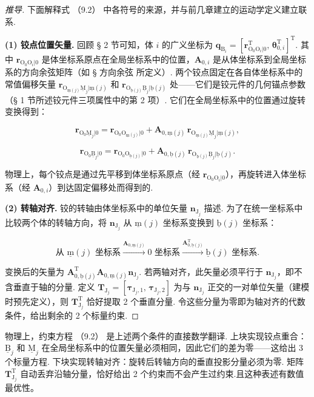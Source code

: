 \begin{proof}[推导]
下面解释式 （9.2） 中各符号的来源，并与前几章建立的运动学定义建立联系.

\textbf{(1) 铰点位置矢量.} 回顾 § 2 节可知，体 $i$ 的广义坐标为 $\boldsymbol{q}_{\text{B}_i} = [\boldsymbol{r}_{\text{O}_0\text{O}_i|0}^\text{T},\, \boldsymbol{\theta}_{0,i}^\text{T}]^\text{T}$. 其中 $\boldsymbol{r}_{\text{O}_0\text{O}_i|0}$ 是体坐标系原点在全局坐标系中的位置，$\boldsymbol{A}_{0,i}$ 是从体坐标系到全局坐标系的方向余弦矩阵（如 § 方向余弦 所定义）. 两个铰点固定在各自体坐标系中的常值偏移矢量 $\boldsymbol{r}_{\text{O}_{\underline{\text{m}}(j)}\underline{\text{M}}_j|\underline{\text{m}}(j)}$ 和 $\boldsymbol{r}_{\text{O}_{\underline{\text{b}}(j)}\underline{\text{B}}_j|\underline{\text{b}}(j)}$ 处——它们是铰元件的几何锚点参数（§ 1 节所述铰元件三项属性中的第 2 项）. 它们在全局坐标系中的位置通过旋转变换得到：

\[
\boldsymbol{r}_{\text{O}_0\underline{\text{M}}_j|0} = \boldsymbol{r}_{\text{O}_0\text{O}_{\underline{\text{m}}(j)}|0} + \boldsymbol{A}_{0,\underline{\text{m}}(j)}\,\boldsymbol{r}_{\text{O}_{\underline{\text{m}}(j)}\underline{\text{M}}_j|\underline{\text{m}}(j)},
\]

\[
\boldsymbol{r}_{\text{O}_0\underline{\text{B}}_j|0} = \boldsymbol{r}_{\text{O}_0\text{O}_{\underline{\text{b}}(j)}|0} + \boldsymbol{A}_{0,\underline{\text{b}}(j)}\,\boldsymbol{r}_{\text{O}_{\underline{\text{b}}(j)}\underline{\text{B}}_j|\underline{\text{b}}(j)}.
\]

物理上，每个铰点是通过先平移到体坐标系原点（经 $\boldsymbol{r}_{\text{O}_0\text{O}_i|0}$），再旋转进入体坐标系（经 $\boldsymbol{A}_{0,i}$）到达固定偏移处而得到的.

\textbf{(2) 转轴对齐.} 铰的转轴由体坐标系中的单位矢量 $\boldsymbol{n}_{\text{J}_j}$ 描述. 为了在统一坐标系中比较两个体的转轴方向，将 $\boldsymbol{n}_{\text{J}_j}$ 从 $\underline{\text{m}}(j)$ 坐标系变换到 $\underline{\text{b}}(j)$ 坐标系：

\[
\text{从 } \underline{\text{m}}(j) \text{ 坐标系} \xrightarrow{\boldsymbol{A}_{0,\underline{\text{m}}(j)}} 0 \text{ 坐标系} \xrightarrow{\boldsymbol{A}_{0,\underline{\text{b}}(j)}^\text{T}} \underline{\text{b}}(j) \text{ 坐标系}.
\]

变换后的矢量为 $\boldsymbol{A}_{0,\underline{\text{b}}(j)}^\text{T} \boldsymbol{A}_{0,\underline{\text{m}}(j)} \boldsymbol{n}_{\text{J}_j}$. 若两轴对齐，此矢量必须平行于 $\boldsymbol{n}_{\text{J}_j}$，即不含垂直于轴的分量. 定义 $\boldsymbol{T}_{\text{J}_j} = [\boldsymbol{\tau}_{\text{J}_{j},1},\, \boldsymbol{\tau}_{\text{J}_{j},2}]$ 为与 $\boldsymbol{n}_{\text{J}_j}$ 正交的一对单位矢量（建模时预先定义），则 $\boldsymbol{T}_{\text{J}_j}^\text{T}$ 恰好提取 2 个垂直分量. 令这些分量为零即为轴对齐的代数条件，给出剩余的 2 个标量约束.
\end{proof}
物理上，约束方程 （9.2） 是上述两个条件的直接数学翻译. 上块实现铰点重合：$\underline{\text{B}}_j$ 和 $\underline{\text{M}}_j$ 在全局坐标系中的位置矢量必须相同，因此它们的差为零——这给出 3 个标量方程. 下块实现转轴对齐：旋转后转轴方向的垂直投影分量必须为零. 矩阵 $\boldsymbol{T}_{\text{J}_j}^\text{T}$ 自动丢弃沿轴分量，恰好给出 2 个约束而不会产生过约束.且这种表述有数值最优性。

